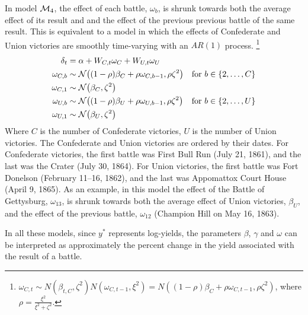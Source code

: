 In model $\mathcal{M}_{\text{4}}$, the effect of each battle, $\omega_{b}$, is shrunk towards both the average effect of its result and and the effect of the previous previous battle of the same result.
This is equivalent to a model in which the effects of Confederate and Union victories are smoothly time-varying with an $AR(1)$ process.%
\footnote{
   $\omega_{C,t} \sim N(\beta_{t,C}, \zeta^{2}) N(\omega_{C,t-1}, \xi^{2}) = N((1 - \rho) \beta_{C} + \rho \omega_{C,t-1}, \rho \zeta^{2})$, where $\rho = \frac{\xi^{2}}{\xi^{2} + \zeta^{2}}$.
}
\begin{align}
  \label{bonds:eq:11}
  \delta_{t} &= \alpha + W_{C,t} \omega_{C} + W_{U,t} \omega_{U} \\
  \omega_{C,b} & \sim \mathcal{N}\mathopen{}\left((1 - \rho) \beta_{C} + \rho \omega_{C,b-1}, \rho \zeta^{2}\right)\mathclose{} & \text{for $b \in \{2, \dots, C\}$} \\
  \omega_{C,1} & \sim \mathcal{N}\mathopen{}\left( \beta_{C}, \zeta^{2}\right)\mathclose{} \\
  \omega_{U,b} & \sim \mathcal{N}\mathopen{}\left((1 - \rho) \beta_{U} + \rho \omega_{U,b-1}, \rho \zeta^{2}\right)\mathclose{} & \text{for $b \in \{2, \dots, U \}$} \\
  \omega_{U,1} & \sim \mathcal{N}\mathopen{}\left( \beta_{U}, \zeta^{2}\right)\mathclose{}
\end{align}
Where $C$ is the number of Confederate victories, $U$ is the number of Union victories.
The Confederate and Union victories are ordered by their dates.
For Confederate victories, the first battle was First Bull Run (July 21, 1861), and the last was the Crater (July 30, 1864).
For Union victories, the first battle was Fort Donelson (February 11--16, 1862), and the last was Appomattox Court House (April 9, 1865).
As an example, in this model the effect of the Battle of Gettysburg, $\omega_{13}$, is shrunk towards both the average effect of Union victories, $\beta_{U}$, and the effect of the previous battle, $\omega_{12}$ (Champion Hill on May 16, 1863).%

In all these models, since $y^{*}$ represents log-yields, the parameters $\beta$, $\gamma$ and $\omega$ can be interpreted as approximately the percent change in the yield associated with the result of a battle.

